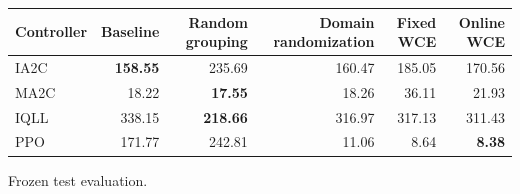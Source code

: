 \begin{tabular}{lrrrrr}
\hline
Controller & Baseline & Random grouping & Domain randomization & Fixed WCE & Online WCE \\
\hline
IA2C & \textbf{158.55} & 235.69 & 160.47 & 185.05 & 170.56 \\
MA2C & 18.22 & \textbf{17.55} & 18.26 & 36.11 & 21.93 \\
IQLL & 338.15 & \textbf{218.66} & 316.97 & 317.13 & 311.43 \\
PPO & 171.77 & 242.81 & 11.06 & 8.64 & \textbf{8.38} \\
\hline
\end{tabular}
Frozen test evaluation.
